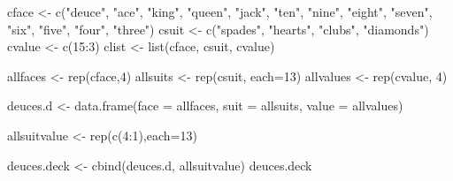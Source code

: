 \documentclass[
]{article}
\newenvironment{Shaded}{\begin{snugshade}}{\end{snugshade}}
\newcommand{\AttributeTok}[1]{\textcolor[rgb]{0.77,0.63,0.00}{#1}}
\newcommand{\DecValTok}[1]{\textcolor[rgb]{0.00,0.00,0.81}{#1}}
\newcommand{\FunctionTok}[1]{\textcolor[rgb]{0.00,0.00,0.00}{#1}}
\newcommand{\NormalTok}[1]{#1}
\newcommand{\OtherTok}[1]{\textcolor[rgb]{0.56,0.35,0.01}{#1}}
\newcommand{\SpecialCharTok}[1]{\textcolor[rgb]{0.00,0.00,0.00}{#1}}
\newcommand{\StringTok}[1]{\textcolor[rgb]{0.31,0.60,0.02}{#1}}
\begin{document}
\begin{Shaded}
\begin{Highlighting}[]
\NormalTok{cface }\OtherTok{\textless{}{-}} \FunctionTok{c}\NormalTok{(}\StringTok{"deuce"}\NormalTok{, }\StringTok{"ace"}\NormalTok{, }\StringTok{"king"}\NormalTok{, }\StringTok{"queen"}\NormalTok{, }\StringTok{"jack"}\NormalTok{, }\StringTok{"ten"}\NormalTok{, }\StringTok{"nine"}\NormalTok{, }\StringTok{"eight"}\NormalTok{, }\StringTok{"seven"}\NormalTok{, }\StringTok{"six"}\NormalTok{, }\StringTok{"five"}\NormalTok{, }\StringTok{"four"}\NormalTok{, }\StringTok{"three"}\NormalTok{)}
\NormalTok{csuit }\OtherTok{\textless{}{-}} \FunctionTok{c}\NormalTok{(}\StringTok{"spades"}\NormalTok{, }\StringTok{"hearts"}\NormalTok{, }\StringTok{"clubs"}\NormalTok{, }\StringTok{"diamonds"}\NormalTok{)}
\NormalTok{cvalue }\OtherTok{\textless{}{-}} \FunctionTok{c}\NormalTok{(}\DecValTok{15}\SpecialCharTok{:}\DecValTok{3}\NormalTok{)}
\NormalTok{clist }\OtherTok{\textless{}{-}} \FunctionTok{list}\NormalTok{(cface, csuit, cvalue)}

\NormalTok{allfaces }\OtherTok{\textless{}{-}} \FunctionTok{rep}\NormalTok{(cface,}\DecValTok{4}\NormalTok{)}
\NormalTok{allsuits }\OtherTok{\textless{}{-}} \FunctionTok{rep}\NormalTok{(csuit, }\AttributeTok{each=}\DecValTok{13}\NormalTok{)}
\NormalTok{allvalues }\OtherTok{\textless{}{-}} \FunctionTok{rep}\NormalTok{(cvalue, }\DecValTok{4}\NormalTok{)}

\NormalTok{deuces.d }\OtherTok{\textless{}{-}} \FunctionTok{data.frame}\NormalTok{(}\AttributeTok{face =}\NormalTok{ allfaces, }\AttributeTok{suit =}\NormalTok{ allsuits, }\AttributeTok{value =}\NormalTok{ allvalues)}

\NormalTok{allsuitvalue }\OtherTok{\textless{}{-}} \FunctionTok{rep}\NormalTok{(}\FunctionTok{c}\NormalTok{(}\DecValTok{4}\SpecialCharTok{:}\DecValTok{1}\NormalTok{),}\AttributeTok{each=}\DecValTok{13}\NormalTok{)}

\NormalTok{deuces.deck }\OtherTok{\textless{}{-}} \FunctionTok{cbind}\NormalTok{(deuces.d, allsuitvalue)}
\NormalTok{deuces.deck}
\end{Highlighting}
\end{Shaded}
\end{document}
